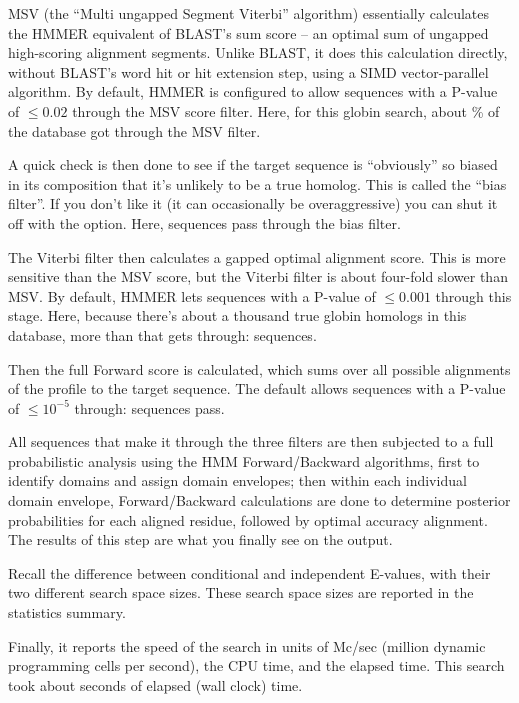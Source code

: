 MSV (the ``Multi ungapped Segment Viterbi'' algorithm) essentially
calculates the HMMER equivalent of BLAST's sum score -- an optimal sum
of ungapped high-scoring alignment segments. Unlike BLAST, it does
this calculation directly, without BLAST's word hit or hit extension
step, using a SIMD vector-parallel algorithm. By default, HMMER is
configured to allow sequences with a P-value of $\leq 0.02$ through
the MSV score filter. Here, for this globin search, about
\SGUmsvpass{}\% of the database got through the MSV filter.

A quick check is then done to see if the target sequence is
``obviously'' so biased in its composition that it's unlikely to be a
true homolog. This is called the ``bias filter''. If you don't like it
(it can occasionally be overaggressive) you can shut it off with the
 option. Here, \SGUbiaspass{} sequences pass through the bias
filter.

The Viterbi filter then calculates a gapped optimal alignment score.
This is more sensitive than the MSV score, but the Viterbi filter is
about four-fold slower than MSV. By default, HMMER lets sequences
with a P-value of $\leq 0.001$ through this stage. Here, because
there's about a thousand true globin homologs in this database, more
than that gets through: \SGUvitpass{} sequences.

Then the full Forward score is calculated, which sums over all
possible alignments of the profile to the target sequence. The default
allows sequences with a P-value of $\leq 10^{-5}$ through: \SGUfwdpass{}
sequences pass.

All sequences that make it through the three filters are then
subjected to a full probabilistic analysis using the HMM
Forward/Backward algorithms, first to identify domains and assign
domain envelopes; then within each individual domain envelope,
Forward/Backward calculations are done to determine posterior
probabilities for each aligned residue, followed by optimal accuracy
alignment. The results of this step are what you finally see on the
output.

Recall the difference between conditional and independent E-values,
with their two different search space sizes. These search space sizes
are reported in the statistics summary.

Finally, it reports the speed of the search in units of Mc/sec
(million dynamic programming cells per second), the CPU time, and the
elapsed time. This search took about \SGUelapsed{} seconds of elapsed
(wall clock) time.



